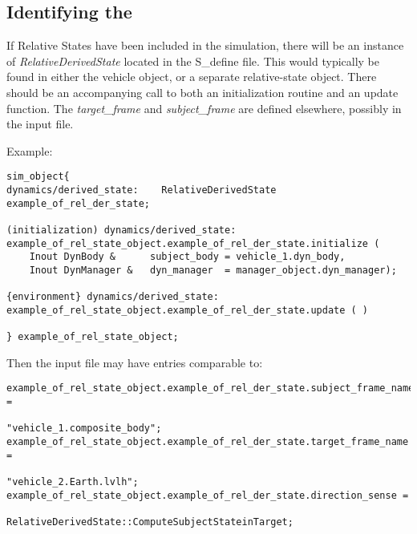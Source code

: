 %
%
% 
%


\label{sec:relativeuseranalysis}

\subsection{Identifying the \RelativeDescT}
If Relative States have been included in the simulation, there will be an instance of \textit{RelativeDerivedState} located in the S\_define file.  This would typically be found in either the vehicle object, or a separate relative-state object.  There should be an accompanying call to both an initialization routine and an update function.  The \textit{target\_frame} and \textit{subject\_frame} are defined elsewhere, possibly in the input file.

Example:
\begin{verbatim}
sim_object{
dynamics/derived_state:    RelativeDerivedState example_of_rel_der_state;

(initialization) dynamics/derived_state:
example_of_rel_state_object.example_of_rel_der_state.initialize (
    Inout DynBody &      subject_body = vehicle_1.dyn_body,
    Inout DynManager &   dyn_manager  = manager_object.dyn_manager);
    
{environment} dynamics/derived_state:
example_of_rel_state_object.example_of_rel_der_state.update ( )

} example_of_rel_state_object;
\end{verbatim}

Then the input file may have entries comparable to:
\begin{verbatim}
example_of_rel_state_object.example_of_rel_der_state.subject_frame_name = 
                                                 "vehicle_1.composite_body";
example_of_rel_state_object.example_of_rel_der_state.target_frame_name = 
                                                 "vehicle_2.Earth.lvlh";
example_of_rel_state_object.example_of_rel_der_state.direction_sense = 
                              RelativeDerivedState::ComputeSubjectStateinTarget;
\end{verbatim}

